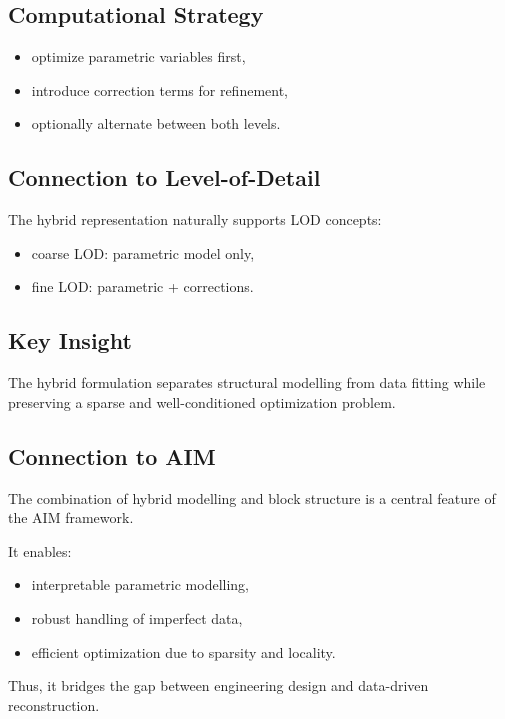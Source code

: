 \subsection{Computational Strategy}

\begin{itemize}
\item optimize parametric variables first,
\item introduce correction terms for refinement,
\item optionally alternate between both levels.
\end{itemize}

\subsection{Connection to Level-of-Detail}

The hybrid representation naturally supports LOD concepts:
\begin{itemize}
\item coarse LOD: parametric model only,
\item fine LOD: parametric + corrections.
\end{itemize}

\subsection{Key Insight}

\begin{proposition}
The hybrid formulation separates structural modelling from data fitting
while preserving a sparse and well-conditioned optimization problem.
\end{proposition}

\subsection{Connection to AIM}

\begin{summary}
The combination of hybrid modelling and block structure is a central
feature of the AIM framework.

It enables:
\begin{itemize}
\item interpretable parametric modelling,
\item robust handling of imperfect data,
\item efficient optimization due to sparsity and locality.
\end{itemize}

Thus, it bridges the gap between engineering design and data-driven
reconstruction.
\end{summary}
